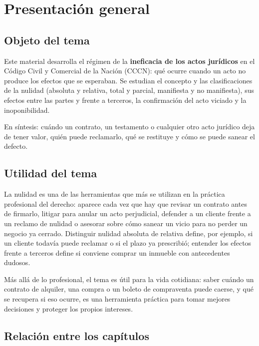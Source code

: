 \documentclass[12pt,oneside]{book}
\begin{document}
\chapter*{Presentación general}

\section*{Objeto del tema}

Este material desarrolla el régimen de la \textbf{ineficacia de los actos jurídicos} en el Código Civil y Comercial de la Nación (CCCN): qué ocurre cuando un acto no produce los efectos que se esperaban. Se estudian el concepto y las clasificaciones de la nulidad (absoluta y relativa, total y parcial, manifiesta y no manifiesta), sus efectos entre las partes y frente a terceros, la confirmación del acto viciado y la inoponibilidad.

En síntesis: cuándo un contrato, un testamento o cualquier otro acto jurídico deja de tener valor, quién puede reclamarlo, qué se restituye y cómo se puede sanear el defecto.

\section*{Utilidad del tema}

La nulidad es una de las herramientas que más se utilizan en la práctica profesional del derecho: aparece cada vez que hay que revisar un contrato antes de firmarlo, litigar para anular un acto perjudicial, defender a un cliente frente a un reclamo de nulidad o asesorar sobre cómo sanear un vicio para no perder un negocio ya cerrado. Distinguir nulidad absoluta de relativa define, por ejemplo, si un cliente todavía puede reclamar o si el plazo ya prescribió; entender los efectos frente a terceros define si conviene comprar un inmueble con antecedentes dudosos.

Más allá de lo profesional, el tema es útil para la vida cotidiana: saber cuándo un contrato de alquiler, una compra o un boleto de compraventa puede caerse, y qué se recupera si eso ocurre, es una herramienta práctica para tomar mejores decisiones y proteger los propios intereses.

\section*{Relación entre los capítulos}
\end{document}
